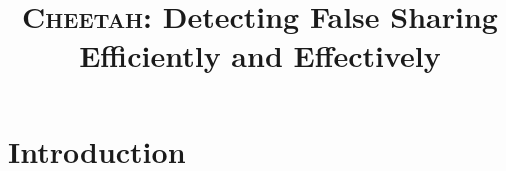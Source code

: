 \documentclass[10pt,nocopyrightspace]{sigplanconf}
\date{} %
\newcommand{\punt}[1]{}
\newcommand{\Cheetah}{{\scshape Cheetah}}
\begin{document}
\setlength{\pdfpageheight}{\paperheight}
\setlength{\pdfpagewidth}{\paperwidth}



\title{{\huge \bf \Cheetah{}}: Detecting False Sharing Efficiently and Effectively}

\authorinfo{}


\maketitle

\begin{abstract}


\end{abstract}



\punt{
\category{D.1.3}{Programming Techniques}{Concurrent Programming--Parallel Programming}
\category{D.2.5}{Software Engineering}{Testing and Debugging--Debugging Aids}

\terms
Design, Reliability, Performance

\keywords
False Sharing, Detection Tools, Performance 
}



\section{Introduction}


%
\end{document}
